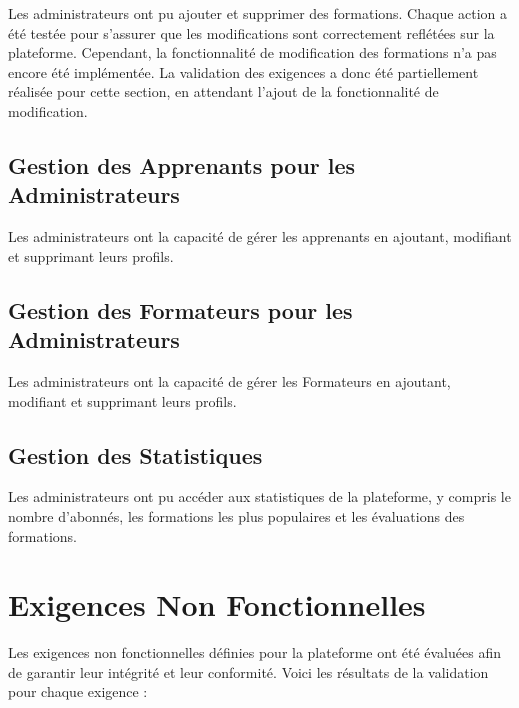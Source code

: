 Les administrateurs ont pu ajouter et supprimer des formations. Chaque action a été testée pour s'assurer que les modifications sont correctement reflétées sur la plateforme. Cependant, la fonctionnalité de modification des formations n'a pas encore été implémentée. La validation des exigences a donc été partiellement réalisée pour cette section, en attendant l'ajout de la fonctionnalité de modification.

\subsection{Gestion des Apprenants pour les Administrateurs}

Les administrateurs ont la capacité de gérer les apprenants en ajoutant, modifiant et supprimant leurs profils.

\subsection{Gestion des Formateurs pour les Administrateurs}

Les administrateurs ont la capacité de gérer les Formateurs en ajoutant, modifiant et supprimant leurs profils.


\subsection{Gestion des Statistiques}

Les administrateurs ont pu accéder aux statistiques de la plateforme, y compris le nombre d'abonnés, les formations les plus populaires et les évaluations des formations.


\section{Exigences Non Fonctionnelles}

Les exigences non fonctionnelles définies pour la plateforme ont été évaluées afin de garantir leur intégrité et leur conformité. Voici les résultats de la validation pour chaque exigence :

